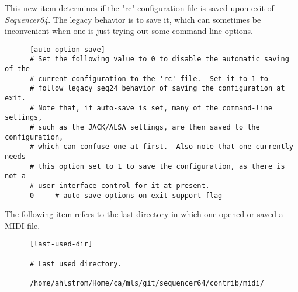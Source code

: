    This new item determines if the "rc" configuration file is saved
   upon exit of \textsl{Sequencer64}.  The legacy behavior is to save it,
   which can sometimes be inconvenient when one is just trying out some
   command-line options.

   \begin{verbatim}
      [auto-option-save]
      # Set the following value to 0 to disable the automatic saving of the
      # current configuration to the 'rc' file.  Set it to 1 to
      # follow legacy seq24 behavior of saving the configuration at exit.
      # Note that, if auto-save is set, many of the command-line settings,
      # such as the JACK/ALSA settings, are then saved to the configuration,
      # which can confuse one at first.  Also note that one currently needs
      # this option set to 1 to save the configuration, as there is not a
      # user-interface control for it at present.
      0     # auto-save-options-on-exit support flag
   \end{verbatim}

   The following item refers to the last directory in which one opened or
   saved a MIDI file.

   \begin{verbatim}
      [last-used-dir]

      # Last used directory.

      /home/ahlstrom/Home/ca/mls/git/sequencer64/contrib/midi/
   \end{verbatim}

